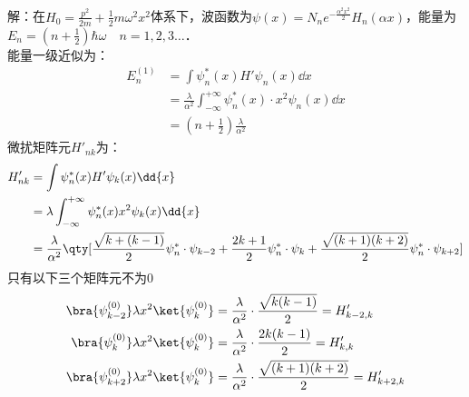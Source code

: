 \subsection{ }
解：在$H_0=\frac{p^2}{2m}+\frac{1}{2}m\omega^2x^2$体系下，波函数为$\psi(x)=N_ne^{-\frac{\alpha^2x^2}{2}}H_n(\alpha x) $，能量为$E_n=(n+\frac{1}{2})\hbar\omega \quad n=1,2,3\dots$．\\
能量一级近似为：
\begin{equation}
\begin{aligned}
E^{(1)}_n&=\int \psi^*_n(x)H'\psi_n(x)\dd{x} \\
&=\frac{\lambda}{\alpha^2}\int^{+\infty}_{-\infty}\psi^*_n(x)\cdot x^2\psi_n(x)\dd{x} \\
&=(n+\frac{1}{2})\frac{\lambda}{\alpha^2}
\end{aligned}
\end{equation}
微扰矩阵元$H'_{nk}$为：
\begin{equation}
\begin{aligned}
H'_{nk}&=\int\psi^*_n(x)H'\psi_k(x)\dd{x}\\
&=\lambda\int^{+\infty}_{-\infty}\psi^*_n(x)x^2\psi_k(x)\dd{x}\\
&=\frac{\lambda}{\alpha^2}\qty[\frac{\sqrt{k+(k-1)}}{2}\psi^*_n\cdot\psi_{k-2}+\frac{2k+1}{2}\psi^*_n\cdot\psi_k+\frac{\sqrt{(k+1)(k+2)}}{2}\psi^*_n\cdot\psi_{k+2}]
\end{aligned}
\end{equation}
只有以下三个矩阵元不为0
\begin{equation}
\begin{aligned}
\bra{\psi^{(0)}_{k-2}}\lambda x^2\ket{\psi^{(0)}_k}&=\frac{\lambda}{\alpha^2}\cdot\frac{\sqrt{k(k-1)}}{2}=H'_{k-2,k}\\
\bra{\psi^{(0)}_{k}}\lambda x^2\ket{\psi^{(0)}_k}&=\frac{\lambda}{\alpha^2}\cdot\frac{2k(k-1)}{2}=H'_{k,k}\\
\bra{\psi^{(0)}_{k+2}}\lambda x^2\ket{\psi^{(0)}_k}&=\frac{\lambda}{\alpha^2}\cdot\frac{\sqrt{(k+1)(k+2)}}{2}=H'_{k+2,k}
\end{aligned}
\end{equation}
